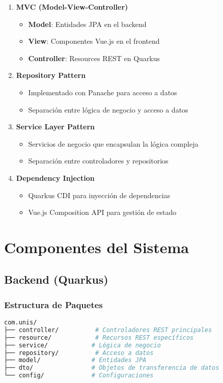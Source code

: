 \documentclass[12pt,a4paper]{article}
\begin{document}
\begin{enumerate}
    \item \textbf{MVC (Model-View-Controller)}
    \begin{itemize}
        \item \textbf{Model}: Entidades JPA en el backend
        \item \textbf{View}: Componentes Vue.js en el frontend
        \item \textbf{Controller}: Resources REST en Quarkus
    \end{itemize}
    
    \item \textbf{Repository Pattern}
    \begin{itemize}
        \item Implementado con Panache para acceso a datos
        \item Separación entre lógica de negocio y acceso a datos
    \end{itemize}
    
    \item \textbf{Service Layer Pattern}
    \begin{itemize}
        \item Servicios de negocio que encapsulan la lógica compleja
        \item Separación entre controladores y repositorios
    \end{itemize}
    
    \item \textbf{Dependency Injection}
    \begin{itemize}
        \item Quarkus CDI para inyección de dependencias
        \item Vue.js Composition API para gestión de estado
    \end{itemize}
\end{enumerate}

\section{Componentes del Sistema}

\subsection{Backend (Quarkus)}

\subsubsection{Estructura de Paquetes}
\begin{lstlisting}[language=bash]
com.unis/
├── controller/          # Controladores REST principales
├── resource/            # Recursos REST específicos
├── service/            # Lógica de negocio
├── repository/          # Acceso a datos
├── model/              # Entidades JPA
├── dto/                # Objetos de transferencia de datos
└── config/             # Configuraciones
\end{lstlisting}
\end{document}

